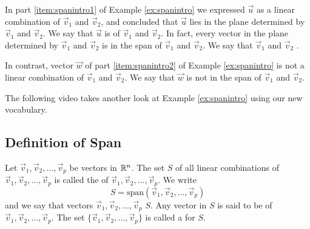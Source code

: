 \documentclass{ximera}
\begin{document}
\begin{example}
\begin{explanation}
\begin{center}
\end{center}
  
  \end{explanation}
\end{example}

In part \ref{item:spanintro1} of Example \ref{ex:spanintro} we expressed $\vec{u}$ as a linear combination of $\vec{v}_1$ and $\vec{v}_2$, and concluded that $\vec{u}$ lies in the plane determined by $\vec{v}_1$ and $\vec{v}_2$.  We say that $\vec{u}$ is  of $\vec{v}_1$ and $\vec{v}_2$.  In fact, every vector in the plane determined by $\vec{v}_1$ and $\vec{v}_2$ is in the span of $\vec{v}_1$ and $\vec{v}_2$.  We say that $\vec{v}_1$ and $\vec{v}_2$ .

In contrast, vector $\vec{w}$ of part \ref{item:spanintro2} of Example \ref{ex:spanintro} is not a linear combination of $\vec{v}_1$ and $\vec{v}_2$.  We say that $\vec{w}$ is not in the span of $\vec{v}_1$ and $\vec{v}_2$.

The following video takes another look at Example \ref{ex:spanintro} using our new vocabulary.


\subsection*{Definition of Span}

\begin{definition}\label{def:span} Let $\vec{v}_1, \vec{v}_2,\ldots ,\vec{v}_p$ be vectors in $\mathbb{R}^n$.  The set $S$ of all linear combinations of $\vec{v}_1, \vec{v}_2,\ldots ,\vec{v}_p$ is called the  of $\vec{v}_1, \vec{v}_2,\ldots ,\vec{v}_p$.  We write 
$$S=\mbox{span}(\vec{v}_1, \vec{v}_2,\ldots ,\vec{v}_p)$$
and we say that vectors $\vec{v}_1, \vec{v}_2,\ldots ,\vec{v}_p$  $S$.  Any vector in $S$ is said to be  of $\vec{v}_1, \vec{v}_2,\ldots ,\vec{v}_p$.  The set $\{\vec{v}_1, \vec{v}_2,\ldots ,\vec{v}_p\}$ is called a  for $S$.
\end{definition}
\end{document}
